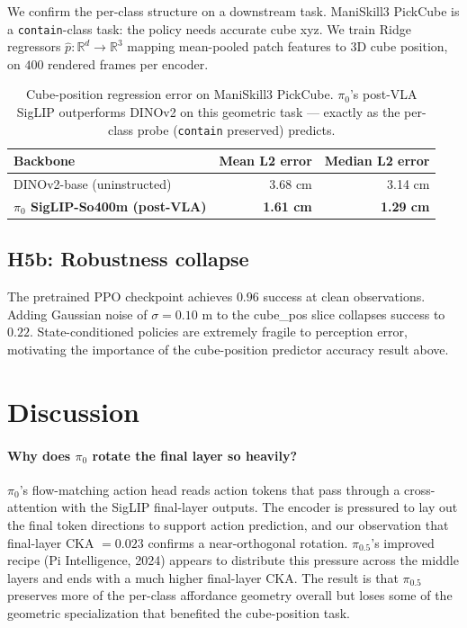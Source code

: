 \documentclass[10pt]{article}
\begin{document}
We confirm the per-class structure on a downstream task. ManiSkill3
PickCube is a \texttt{contain}-class task: the policy needs accurate cube
xyz. We train Ridge regressors $\hat{p} : \mathbb{R}^d \to \mathbb{R}^3$
mapping mean-pooled patch features to 3D cube position, on $400$ rendered
frames per encoder.

\begin{table}[ht]
\centering
\small
\begin{tabular}{lrr}
\toprule
Backbone & Mean L2 error & Median L2 error \\
\midrule
DINOv2-base (uninstructed) & 3.68 cm & 3.14 cm \\
\textbf{$\pi_0$ SigLIP-So400m (post-VLA)} & \textbf{1.61 cm} & \textbf{1.29 cm} \\
\bottomrule
\end{tabular}
\caption{Cube-position regression error on ManiSkill3 PickCube. $\pi_0$'s
post-VLA SigLIP outperforms DINOv2 on this geometric task — exactly as the
per-class probe (\texttt{contain} preserved) predicts.}
\label{tab:h6}
\end{table}

\subsection{H5b: Robustness collapse}

The pretrained PPO checkpoint achieves $0.96$ success at clean
observations. Adding Gaussian noise of $\sigma = 0.10$ m to the cube\_pos
slice collapses success to $0.22$. State-conditioned policies are extremely
fragile to perception error, motivating the importance of the cube-position
predictor accuracy result above.

\section{Discussion}

\paragraph{Why does $\pi_0$ rotate the final layer so heavily?} $\pi_0$'s
flow-matching action head reads action tokens that pass through a
cross-attention with the SigLIP final-layer outputs. The encoder is
pressured to lay out the final token directions to support action
prediction, and our observation that final-layer CKA $= 0.023$ confirms a
near-orthogonal rotation. $\pi_{0.5}$'s improved recipe (Pi Intelligence,
2024) appears to distribute this pressure across the middle layers and
ends with a much higher final-layer CKA. The result is that $\pi_{0.5}$
preserves more of the per-class affordance geometry overall but loses some
of the geometric specialization that benefited the cube-position task.
\end{document}
